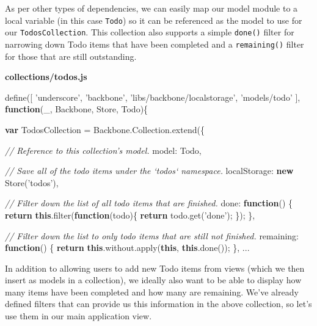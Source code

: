 \documentclass[9pt]{book}
\newenvironment{Shaded}{}{}
\newcommand{\KeywordTok}[1]{\textcolor[rgb]{0.00,0.44,0.13}{\textbf{{#1}}}}
\newcommand{\DataTypeTok}[1]{\textcolor[rgb]{0.56,0.13,0.00}{{#1}}}
\newcommand{\StringTok}[1]{\textcolor[rgb]{0.25,0.44,0.63}{{#1}}}
\newcommand{\CommentTok}[1]{\textcolor[rgb]{0.38,0.63,0.69}{\textit{{#1}}}}
\newcommand{\OtherTok}[1]{\textcolor[rgb]{0.00,0.44,0.13}{{#1}}}
\newcommand{\FunctionTok}[1]{\textcolor[rgb]{0.02,0.16,0.49}{{#1}}}
\newcommand{\NormalTok}[1]{{#1}}
\begin{document}
As per other types of dependencies, we can easily map our model module
to a local variable (in this case \texttt{Todo}) so it can be referenced
as the model to use for our \texttt{TodosCollection}. This collection
also supports a simple \texttt{done()} filter for narrowing down Todo
items that have been completed and a \texttt{remaining()} filter for
those that are still outstanding.

\textbf{collections/todos.js}

\begin{Shaded}
\begin{Highlighting}[]
\FunctionTok{define}\NormalTok{([}
  \StringTok{'underscore'}\NormalTok{,}
  \StringTok{'backbone'}\NormalTok{,}
  \StringTok{'libs/backbone/localstorage'}\NormalTok{,}
  \StringTok{'models/todo'}
  \NormalTok{], }\KeywordTok{function}\NormalTok{(_, Backbone, Store, Todo)\{}

    \KeywordTok{var} \NormalTok{TodosCollection = }\OtherTok{Backbone}\NormalTok{.}\OtherTok{Collection}\NormalTok{.}\FunctionTok{extend}\NormalTok{(\{}

    \CommentTok{// Reference to this collection's model.}
    \DataTypeTok{model}\NormalTok{: Todo,}

    \CommentTok{// Save all of the todo items under the `todos` namespace.}
    \DataTypeTok{localStorage}\NormalTok{: }\KeywordTok{new} \FunctionTok{Store}\NormalTok{(}\StringTok{'todos'}\NormalTok{),}

    \CommentTok{// Filter down the list of all todo items that are finished.}
    \DataTypeTok{done}\NormalTok{: }\KeywordTok{function}\NormalTok{() \{}
      \KeywordTok{return} \KeywordTok{this}\NormalTok{.}\FunctionTok{filter}\NormalTok{(}\KeywordTok{function}\NormalTok{(todo)\{ }\KeywordTok{return} \OtherTok{todo}\NormalTok{.}\FunctionTok{get}\NormalTok{(}\StringTok{'done'}\NormalTok{); \});}
    \NormalTok{\},}

    \CommentTok{// Filter down the list to only todo items that are still not finished.}
    \DataTypeTok{remaining}\NormalTok{: }\KeywordTok{function}\NormalTok{() \{}
      \KeywordTok{return} \KeywordTok{this}\NormalTok{.}\OtherTok{without}\NormalTok{.}\FunctionTok{apply}\NormalTok{(}\KeywordTok{this}\NormalTok{, }\KeywordTok{this}\NormalTok{.}\FunctionTok{done}\NormalTok{());}
    \NormalTok{\},}
    \NormalTok{...}
\end{Highlighting}
\end{Shaded}

In addition to allowing users to add new Todo items from views (which we
then insert as models in a collection), we ideally also want to be able
to display how many items have been completed and how many are
remaining. We've already defined filters that can provide us this
information in the above collection, so let's use them in our main
application view.
\end{document}
